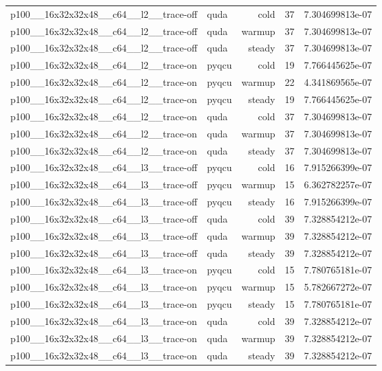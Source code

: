 \begin{table}[htbp]
\begin{tabular}{@{}llrrr@{}}
p100\_\_16x32x32x48\_\_c64\_\_l2\_\_trace-off & quda & cold & 37 & 7.304699813e-07 \\
p100\_\_16x32x32x48\_\_c64\_\_l2\_\_trace-off & quda & warmup & 37 & 7.304699813e-07 \\
p100\_\_16x32x32x48\_\_c64\_\_l2\_\_trace-off & quda & steady & 37 & 7.304699813e-07 \\
p100\_\_16x32x32x48\_\_c64\_\_l2\_\_trace-on & pyqcu & cold & 19 & 7.766445625e-07 \\
p100\_\_16x32x32x48\_\_c64\_\_l2\_\_trace-on & pyqcu & warmup & 22 & 4.341869565e-07 \\
p100\_\_16x32x32x48\_\_c64\_\_l2\_\_trace-on & pyqcu & steady & 19 & 7.766445625e-07 \\
p100\_\_16x32x32x48\_\_c64\_\_l2\_\_trace-on & quda & cold & 37 & 7.304699813e-07 \\
p100\_\_16x32x32x48\_\_c64\_\_l2\_\_trace-on & quda & warmup & 37 & 7.304699813e-07 \\
p100\_\_16x32x32x48\_\_c64\_\_l2\_\_trace-on & quda & steady & 37 & 7.304699813e-07 \\
p100\_\_16x32x32x48\_\_c64\_\_l3\_\_trace-off & pyqcu & cold & 16 & 7.915266399e-07 \\
p100\_\_16x32x32x48\_\_c64\_\_l3\_\_trace-off & pyqcu & warmup & 15 & 6.362782257e-07 \\
p100\_\_16x32x32x48\_\_c64\_\_l3\_\_trace-off & pyqcu & steady & 16 & 7.915266399e-07 \\
p100\_\_16x32x32x48\_\_c64\_\_l3\_\_trace-off & quda & cold & 39 & 7.328854212e-07 \\
p100\_\_16x32x32x48\_\_c64\_\_l3\_\_trace-off & quda & warmup & 39 & 7.328854212e-07 \\
p100\_\_16x32x32x48\_\_c64\_\_l3\_\_trace-off & quda & steady & 39 & 7.328854212e-07 \\
p100\_\_16x32x32x48\_\_c64\_\_l3\_\_trace-on & pyqcu & cold & 15 & 7.780765181e-07 \\
p100\_\_16x32x32x48\_\_c64\_\_l3\_\_trace-on & pyqcu & warmup & 15 & 5.782667272e-07 \\
p100\_\_16x32x32x48\_\_c64\_\_l3\_\_trace-on & pyqcu & steady & 15 & 7.780765181e-07 \\
p100\_\_16x32x32x48\_\_c64\_\_l3\_\_trace-on & quda & cold & 39 & 7.328854212e-07 \\
p100\_\_16x32x32x48\_\_c64\_\_l3\_\_trace-on & quda & warmup & 39 & 7.328854212e-07 \\
p100\_\_16x32x32x48\_\_c64\_\_l3\_\_trace-on & quda & steady & 39 & 7.328854212e-07 \\

\end{tabular}
\end{table}
